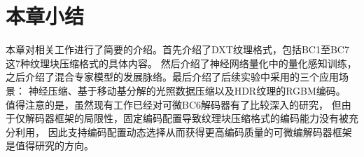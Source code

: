 

\section{本章小结}

本章对相关工作进行了简要的介绍。首先介绍了DXT纹理格式，包括BC1至BC7这7种纹理块压缩格式的具体内容。
然后介绍了神经网络量化中的量化感知训练，
之后介绍了混合专家模型的发展脉络。最后介绍了后续实验中采用的三个应用场景：
神经压缩、基于移动基分解的光照数据压缩以及HDR纹理的RGBM编码。
值得注意的是，虽然现有工作已经对可微BC6解码器有了比较深入的研究，
但由于仅解码器框架的局限性，固定编码配置导致纹理块压缩格式的编码能力没有被充分利用，
因此支持编码配置动态选择从而获得更高编码质量的可微编解码器框架是值得研究的方向。
